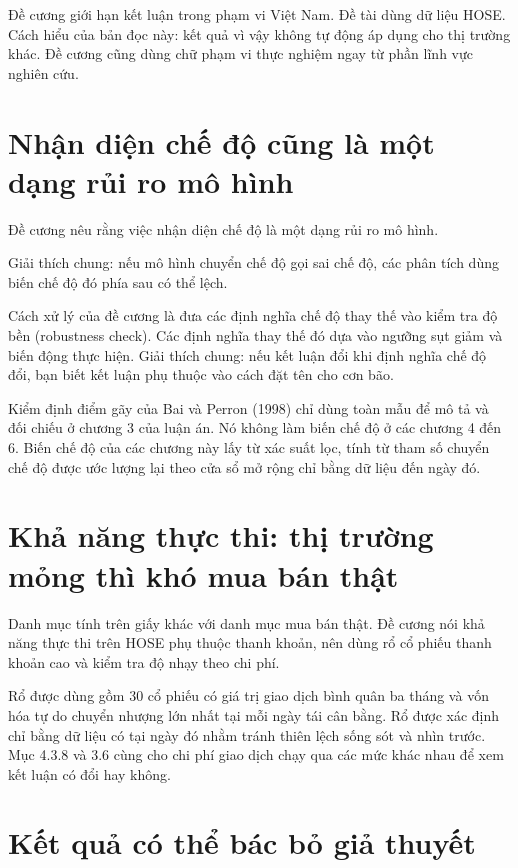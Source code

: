 Đề cương giới hạn kết luận trong phạm vi Việt Nam. Đề tài dùng dữ liệu HOSE. Cách hiểu của bản đọc này: kết quả vì vậy không tự động áp dụng cho thị trường khác. Đề cương cũng dùng chữ phạm vi thực nghiệm ngay từ phần lĩnh vực nghiên cứu.

\section{Nhận diện chế độ cũng là một dạng rủi ro mô hình}

Đề cương nêu rằng việc nhận diện chế độ là một dạng rủi ro mô hình.

Giải thích chung: nếu mô hình chuyển chế độ gọi sai chế độ, các phân tích dùng biến chế độ đó phía sau có thể lệch.

Cách xử lý của đề cương là đưa các định nghĩa chế độ thay thế vào kiểm tra độ bền (robustness check). Các định nghĩa thay thế đó dựa vào ngưỡng sụt giảm và biến động thực hiện. Giải thích chung: nếu kết luận đổi khi định nghĩa chế độ đổi, bạn biết kết luận phụ thuộc vào cách đặt tên cho cơn bão.

Kiểm định điểm gãy của Bai và Perron (1998) chỉ dùng toàn mẫu để mô tả và đối chiếu ở chương 3 của luận án. Nó không làm biến chế độ ở các chương 4 đến 6. Biến chế độ của các chương này lấy từ xác suất lọc, tính từ tham số chuyển chế độ được ước lượng lại theo cửa sổ mở rộng chỉ bằng dữ liệu đến ngày đó.

\section{Khả năng thực thi: thị trường mỏng thì khó mua bán thật}

Danh mục tính trên giấy khác với danh mục mua bán thật. Đề cương nói khả năng thực thi trên HOSE phụ thuộc thanh khoản, nên dùng rổ cổ phiếu thanh khoản cao và kiểm tra độ nhạy theo chi phí.

Rổ được dùng gồm 30 cổ phiếu có giá trị giao dịch bình quân ba tháng và vốn hóa tự do chuyển nhượng lớn nhất tại mỗi ngày tái cân bằng. Rổ được xác định chỉ bằng dữ liệu có tại ngày đó nhằm tránh thiên lệch sống sót và nhìn trước. Mục 4.3.8 và 3.6 cùng cho chi phí giao dịch chạy qua các mức khác nhau để xem kết luận có đổi hay không.

\section{Kết quả có thể bác bỏ giả thuyết}

